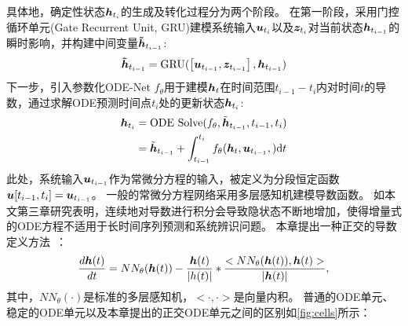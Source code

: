 具体地，确定性状态$\boldsymbol{h}_{t_i}$的生成及转化过程分为两个阶段。
在第一阶段，采用门控循环单元(Gate Recurrent Unit, GRU)建模系统输入$\boldsymbol{u}_{t_i}$以及$\boldsymbol{z}_{t_i}$对当前状态$\boldsymbol{h}_{t_{i-1}}$的瞬时影响，并构建中间变量$\boldsymbol{\tilde{h}}_{t_{i-1}}$:
\begin{equation}
\boldsymbol{\tilde{h}}_{t_{i-1}}  = \text{GRU}(\left [\boldsymbol{u}_{t_{i-1}}, \boldsymbol{z}_{t_{i-1}}\right], \boldsymbol{h}_{t_{i-1}})
\label{equ:gru}
\end{equation}
下一步，引入参数化ODE-Net $f_\theta$用于建模$\boldsymbol h_{t}$在时间范围$t_{i-1}-t_{i}$内对时间$t$的导数，通过求解ODE预测时间点$t_i$处的更新状态$\boldsymbol{h}_{t_i}$:
\begin{equation}
\begin{aligned}
   \boldsymbol{h}_{t_i}&=\text{ODE Solve}(f_\theta, \tilde{\boldsymbol{h}}_{t_{i-1}}, t_{i-1}, t_i) \\
   &= \tilde{\boldsymbol{h}}_{t_{i-1}} + \int_{t_{i-1}}^{t_i}f_\theta(\boldsymbol h_t, \boldsymbol{u}_{t_{i-1}}, ) \text{d}t
   \label{equ:ode}
\end{aligned}
\end{equation}
此处，系统输入$\boldsymbol{u}_{t_{i-1}}$作为常微分方程的输入，被定义为分段恒定函数$\boldsymbol u[t_{i-1},t_i]=\boldsymbol{u}_{t_{i-1}}$。
一般的常微分方程网络采用多层感知机建模导数函数。
如本文第三章研究表明，连续地对导数进行积分会导致隐状态不断地增加，使得增量式的ODE方程不适用于长时间序列预测和系统辨识问题。
本章提出一种正交的导数定义方法~\cite{jia2019neural}：
\begin{equation}
\frac{d \boldsymbol h(t)}{dt}=NN_{\theta}(\boldsymbol h(t))-\frac{\boldsymbol h(t)}{|h(t)|}*\frac{<{NN_{\theta}(\boldsymbol h(t))},{\boldsymbol h(t)}>}{|\boldsymbol h(t)|},
\end{equation}
其中，$NN_{\theta}(\cdot)$是标准的多层感知机，$<\cdot, \cdot>$是向量内积。 
普通的ODE单元、稳定的ODE单元以及本章提出的正交ODE单元之间的区别如\ref{fig:cells}所示：
